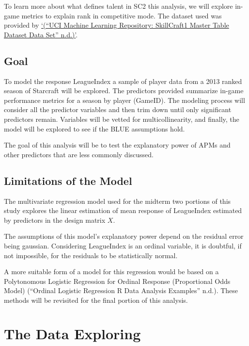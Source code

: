 \documentclass[]{article}
\begin{document}
To learn more about what defines talent in SC2 this analysis, we will
explore in-game metrics to explain rank in competitive mode. The dataset
used was provided by
\href{https://archive.ics.uci.edu/ml/datasets/SkillCraft1+Master+Table+Dataset}{`(``UCI
Machine Learning Repository: SkillCraft1 Master Table Dataset Data Set''
n.d.)'}.

\hypertarget{goal}{%
\subsection{Goal}\label{goal}}

To model the response LeagueIndex a sample of player data from a 2013
ranked season of Starcraft will be explored. The predictors provided
summarize in-game performance metrics for a season by player (GameID).
The modeling process will consider all the predictor variables and then
trim down until only significant predictors remain. Variables will be
vetted for multicollinearity, and finally, the model will be explored to
see if the BLUE assumptions hold.

The goal of this analysis will be to test the explanatory power of APMs
and other predictors that are less commonly discussed.

\hypertarget{limitations-of-the-model}{%
\subsection{Limitations of the Model}\label{limitations-of-the-model}}

The multivariate regression model used for the midterm two portions of
this study explores the linear estimation of mean response of
LeagueIndex estimated by predictors in the design matrix \(X\).

The assumptions of this model's explanatory power depend on the residual
error being gaussian. Considering LeagueIndex is an ordinal variable, it
is doubtful, if not impossible, for the residuals to be statistically
normal.

A more suitable form of a model for this regression would be based on a
Polytonomous Logistic Regression for Ordinal Response (Proportional Odds
Model) (``Ordinal Logistic Regression \textbar{} R Data Analysis
Examples'' n.d.). These methods will be revisited for the final portion
of this analysis.

\hypertarget{the-data-exploring}{%
\section{The Data Exploring}\label{the-data-exploring}}
\end{document}
